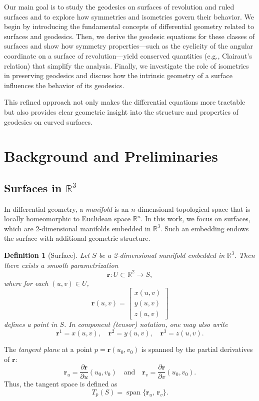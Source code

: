 \documentclass[12pt]{article}
\newcommand{\R}{\mathbb{R}}
\newtheorem{definition}{Definition}[section]
\begin{document}
Our main goal is to study the geodesics on surfaces of revolution and ruled surfaces and to explore how symmetries and isometries govern their behavior. 
We begin by introducing the fundamental concepts of differential geometry related to surfaces and geodesics. 
Then, we derive the geodesic equations for these classes of surfaces and show how symmetry properties—such as the cyclicity of the angular coordinate on a surface of revolution—yield conserved quantities (e.g., Clairaut’s relation) that simplify the analysis. 
Finally, we investigate the role of isometries in preserving geodesics and discuss how the intrinsic geometry of a surface influences the behavior of its geodesics.

This refined approach not only makes the differential equations more tractable but also provides clear geometric insight into the structure and properties of geodesics on curved surfaces.

\section{Background and Preliminaries}


\subsection{Surfaces in \texorpdfstring{$\R^3$}{R3}}

In differential geometry, a \emph{manifold} is an $n$-dimensional topological space that is locally homeomorphic to Euclidean space $\R^n$. In this work, we focus on surfaces, which are 2-dimensional manifolds embedded in $\R^3$. Such an embedding endows the surface with additional geometric structure.

\begin{definition}[Surface]
Let $S$ be a 2-dimensional manifold embedded in $\R^3$. Then there exists a smooth parametrization
\[
    \mathbf{r}: U \subset \R^2 \to S,
\]
where for each $(u,v) \in U$, 
\[
    \mathbf{r}(u,v) = \begin{bmatrix} x(u,v) \\ y(u,v) \\ z(u,v) \end{bmatrix}
\]
defines a point in $S$. In component (tensor) notation, one may also write
\[
    \mathbf{r}^1 = x(u,v), \quad \mathbf{r}^2 = y(u,v), \quad \mathbf{r}^3 = z(u,v).
\]
\end{definition}

The \emph{tangent plane} at a point $p=\mathbf{r}(u_0,v_0)$ is spanned by the partial derivatives of $\mathbf{r}$:
\[
    \mathbf{r}_u = \frac{\partial \mathbf{r}}{\partial u}(u_0,v_0) \quad \text{and} \quad \mathbf{r}_v = \frac{\partial \mathbf{r}}{\partial v}(u_0,v_0).
\]
Thus, the tangent space is defined as
\[
    T_{p}(S) = \operatorname{span}\{\mathbf{r}_u,\, \mathbf{r}_v\}.
\]
\end{document}
